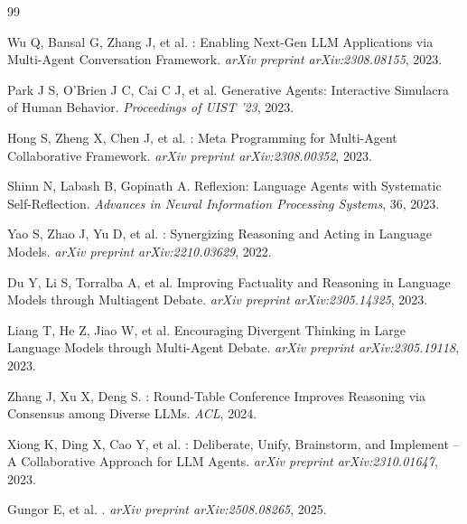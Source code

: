\documentclass[12pt,a4paper]{ctexart}
\begin{document}
\newpage
\begin{thebibliography}{99}

Wu Q, Bansal G, Zhang J, et al.
: Enabling Next-Gen LLM Applications via Multi-Agent Conversation Framework.
\newblock \emph{arXiv preprint arXiv:2308.08155}, 2023.

Park J S, O'Brien J C, Cai C J, et al.
\newblock Generative Agents: Interactive Simulacra of Human Behavior.
\newblock \emph{Proceedings of UIST '23}, 2023.

Hong S, Zheng X, Chen J, et al.
: Meta Programming for Multi-Agent Collaborative Framework.
\newblock \emph{arXiv preprint arXiv:2308.00352}, 2023.

Shinn N, Labash B, Gopinath A.
\newblock Reflexion: Language Agents with Systematic Self-Reflection.
\newblock \emph{Advances in Neural Information Processing Systems}, 36, 2023.

Yao S, Zhao J, Yu D, et al.
: Synergizing Reasoning and Acting in Language Models.
\newblock \emph{arXiv preprint arXiv:2210.03629}, 2022.

Du Y, Li S, Torralba A, et al.
\newblock Improving Factuality and Reasoning in Language Models through Multiagent Debate.
\newblock \emph{arXiv preprint arXiv:2305.14325}, 2023.

Liang T, He Z, Jiao W, et al.
\newblock Encouraging Divergent Thinking in Large Language Models through Multi-Agent Debate.
\newblock \emph{arXiv preprint arXiv:2305.19118}, 2023.

Zhang J, Xu X, Deng S.
: Round-Table Conference Improves Reasoning via Consensus among Diverse LLMs.
\newblock \emph{ACL}, 2024.

Xiong K, Ding X, Cao Y, et al.
: Deliberate, Unify, Brainstorm, and Implement -- A Collaborative Approach for LLM Agents.
\newblock \emph{arXiv preprint arXiv:2310.01647}, 2023.

Gungor E, et al.
.
\newblock \emph{arXiv preprint arXiv:2508.08265}, 2025.


\end{thebibliography}
\end{document}
